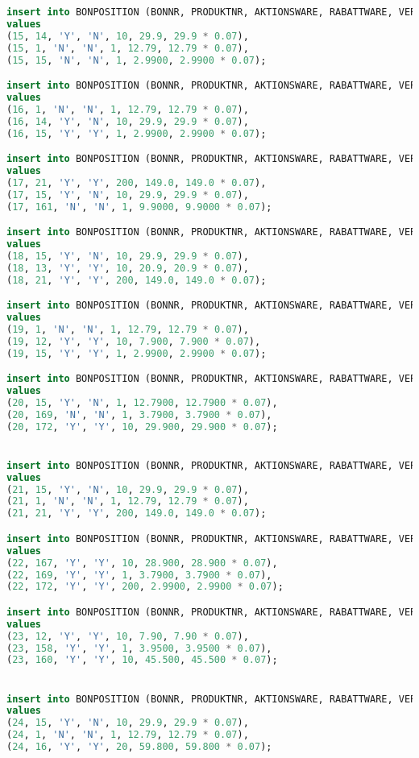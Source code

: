 \begin{lstlisting}[language=SQL]
insert into BONPOSITION (BONNR, PRODUKTNR, AKTIONSWARE, RABATTWARE, VERKAUFSMENGE, VERKAUFSPREIS, MWST)
values
(15, 14, 'Y', 'N', 10, 29.9, 29.9 * 0.07),
(15, 1, 'N', 'N', 1, 12.79, 12.79 * 0.07),
(15, 15, 'N', 'N', 1, 2.9900, 2.9900 * 0.07);

insert into BONPOSITION (BONNR, PRODUKTNR, AKTIONSWARE, RABATTWARE, VERKAUFSMENGE, VERKAUFSPREIS, MWST)
values
(16, 1, 'N', 'N', 1, 12.79, 12.79 * 0.07),
(16, 14, 'Y', 'N', 10, 29.9, 29.9 * 0.07),
(16, 15, 'Y', 'Y', 1, 2.9900, 2.9900 * 0.07);

insert into BONPOSITION (BONNR, PRODUKTNR, AKTIONSWARE, RABATTWARE, VERKAUFSMENGE, VERKAUFSPREIS, MWST)
values
(17, 21, 'Y', 'Y', 200, 149.0, 149.0 * 0.07),
(17, 15, 'Y', 'N', 10, 29.9, 29.9 * 0.07),
(17, 161, 'N', 'N', 1, 9.9000, 9.9000 * 0.07);

insert into BONPOSITION (BONNR, PRODUKTNR, AKTIONSWARE, RABATTWARE, VERKAUFSMENGE, VERKAUFSPREIS, MWST)
values
(18, 15, 'Y', 'N', 10, 29.9, 29.9 * 0.07),
(18, 13, 'Y', 'Y', 10, 20.9, 20.9 * 0.07),
(18, 21, 'Y', 'Y', 200, 149.0, 149.0 * 0.07);

insert into BONPOSITION (BONNR, PRODUKTNR, AKTIONSWARE, RABATTWARE, VERKAUFSMENGE, VERKAUFSPREIS, MWST)
values
(19, 1, 'N', 'N', 1, 12.79, 12.79 * 0.07),
(19, 12, 'Y', 'Y', 10, 7.900, 7.900 * 0.07),
(19, 15, 'Y', 'Y', 1, 2.9900, 2.9900 * 0.07);

insert into BONPOSITION (BONNR, PRODUKTNR, AKTIONSWARE, RABATTWARE, VERKAUFSMENGE, VERKAUFSPREIS, MWST)
values
(20, 15, 'Y', 'N', 1, 12.7900, 12.7900 * 0.07),
(20, 169, 'N', 'N', 1, 3.7900, 3.7900 * 0.07),
(20, 172, 'Y', 'Y', 10, 29.900, 29.900 * 0.07);


insert into BONPOSITION (BONNR, PRODUKTNR, AKTIONSWARE, RABATTWARE, VERKAUFSMENGE, VERKAUFSPREIS, MWST)
values
(21, 15, 'Y', 'N', 10, 29.9, 29.9 * 0.07),
(21, 1, 'N', 'N', 1, 12.79, 12.79 * 0.07),
(21, 21, 'Y', 'Y', 200, 149.0, 149.0 * 0.07);

insert into BONPOSITION (BONNR, PRODUKTNR, AKTIONSWARE, RABATTWARE, VERKAUFSMENGE, VERKAUFSPREIS, MWST)
values
(22, 167, 'Y', 'Y', 10, 28.900, 28.900 * 0.07),
(22, 169, 'Y', 'Y', 1, 3.7900, 3.7900 * 0.07),
(22, 172, 'Y', 'Y', 200, 2.9900, 2.9900 * 0.07);

insert into BONPOSITION (BONNR, PRODUKTNR, AKTIONSWARE, RABATTWARE, VERKAUFSMENGE, VERKAUFSPREIS, MWST)
values
(23, 12, 'Y', 'Y', 10, 7.90, 7.90 * 0.07),
(23, 158, 'Y', 'Y', 1, 3.9500, 3.9500 * 0.07),
(23, 160, 'Y', 'Y', 10, 45.500, 45.500 * 0.07);


insert into BONPOSITION (BONNR, PRODUKTNR, AKTIONSWARE, RABATTWARE, VERKAUFSMENGE, VERKAUFSPREIS, MWST)
values
(24, 15, 'Y', 'N', 10, 29.9, 29.9 * 0.07),
(24, 1, 'N', 'N', 1, 12.79, 12.79 * 0.07),
(24, 16, 'Y', 'Y', 20, 59.800, 59.800 * 0.07);



\end{lstlisting}
